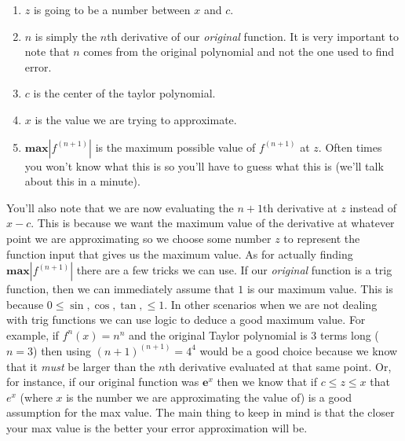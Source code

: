 \documentclass[addpoints]{exam}
\begin{document}
\begin{tcolorbox}[title=TAYLOR'S THEOREM (LAGRANGE ERROR) (cont.) ,colframe=black,sharp corners,colback=white,colbacktitle=white,coltitle=black]
    \begin{enumerate}
        \item $z$ is going to be a number between $x$ and $c$.
        \item $n$ is simply the $n$th derivative of our \textit{original} function. It is very important to note that $n$ comes from the original polynomial and not the one used to find error. 
        \item $c$ is the center of the taylor polynomial.
        \item $x$ is the value we are trying to approximate.
        \item $\textbf{max}\left|f^{\left(n+1\right)}\right|$ is the maximum possible value of $f^{\left(n+1\right)}$ at $z$. Often times you won't know what this is so you'll have to guess what this is (we'll talk about this in a minute).
    \end{enumerate} 
    You'll also note that we are now evaluating the $n+1$th derivative at $z$ instead of $x-c$. This is because we want the maximum value of the derivative at whatever point we are approximating so we choose some number $z$ to represent the function input that gives us the maximum value. 
    \vspace{0.1in}
    \newline
    As for actually finding $\textbf{max}\left|f^{\left(n+1\right)}\right|$ there are a few tricks we can use. If our \textit{original} function is a trig function, then we can immediately assume that $1$ is our maximum value. This is because $0\leq \sin, \cos, \tan, \leq 1$. In other scenarios when we are not dealing with trig functions we can use logic to deduce a good maximum value. For example, if $f^n(x)=n^n$ and the original Taylor polynomial is 3 terms long ($n=3$) then using $\left(n+1\right)^{\left(n+1\right)}=4^4$ would be a good choice because we know that it \textit{must} be larger than the $n$th derivative evaluated at that same point. Or, for instance, if our original function was $\textbf{e}^x$ then we know that if $c \leq z \leq x$ that $e^x$  (where $x$ is the number we are approximating the value of) is a good assumption for the max value. The main thing to keep in mind is that the closer your max value is the better your error approximation will be.
\end{tcolorbox}
\end{document}
